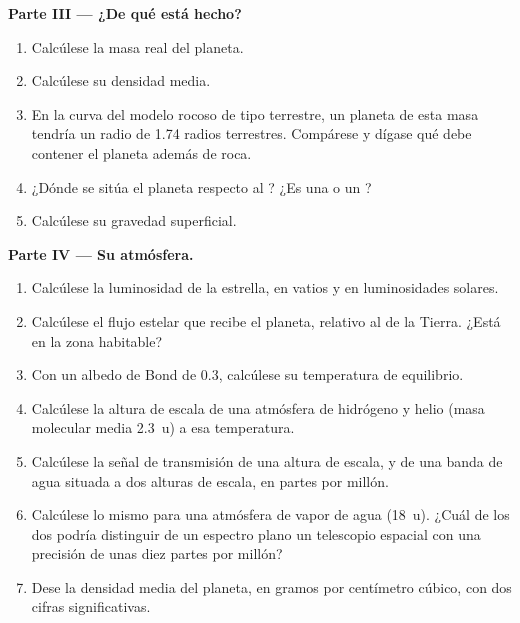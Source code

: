 \begin{problem}
\medskip\noindent\textbf{Parte III --- ¿De qué está hecho?}
\begin{enumerate}[resume]
\item Calcúlese la masa real del planeta.
\item Calcúlese su densidad media.
\item En la curva del modelo rocoso de tipo terrestre, un planeta de esta masa tendría
  un radio de 1.74 radios terrestres. Compárese y dígase qué debe
  contener el planeta además de roca.
\item ¿Dónde se sitúa el planeta respecto al ? ¿Es
  una  o un ?
\item Calcúlese su gravedad superficial.
\end{enumerate}

\medskip\noindent\textbf{Parte IV --- Su atmósfera.}
\begin{enumerate}[resume]
\item Calcúlese la luminosidad de la estrella, en vatios y en luminosidades
  solares.
\item Calcúlese el flujo estelar que recibe el planeta, relativo al de la
  Tierra. ¿Está en la zona habitable?
\item Con un albedo de Bond de 0.3, calcúlese su temperatura de equilibrio.
\item Calcúlese la altura de escala de una atmósfera de hidrógeno y helio
  (masa molecular media \qty{2.3}{u}) a esa temperatura.
\item Calcúlese la señal de transmisión de una altura de escala, y de una
  banda de agua situada a dos alturas de escala, en partes por millón.
\item Calcúlese lo mismo para una atmósfera de vapor de agua (\qty{18}{u}). ¿Cuál de
  los dos podría distinguir de un espectro plano un telescopio espacial con una precisión de unas diez partes por
  millón?
\item Dese la densidad media del planeta, en gramos por centímetro cúbico, con
  dos cifras significativas.
\end{enumerate}
\end{problem}
